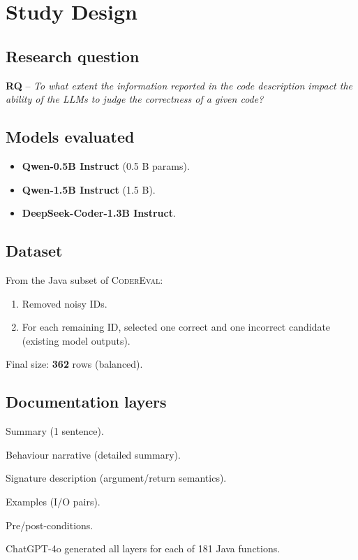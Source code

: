 \documentclass[a4paper]{usiinfbachelorproject}
\begin{document}
\section{Study Design}\label{sec:design}

\subsection*{Research question}
\noindent\textbf{RQ} –  
\emph{To what extent the information reported in the code description impact the ability of the LLMs to judge the correctness of a given code?}

\subsection{Models evaluated}\label{sec:models}
\begin{itemize}[leftmargin=12pt,itemsep=1pt]
  \item \textbf{Qwen-0.5B Instruct} (0.5 B params).  
  \item \textbf{Qwen-1.5B Instruct} (1.5 B).  
  \item \textbf{DeepSeek-Coder-1.3B Instruct}.  
\end{itemize}

\subsection{Dataset}\label{sec:dataset}
From the Java subset of \textsc{CoderEval}:
\begin{enumerate}[label=\alph*),leftmargin=14pt,itemsep=0pt]
  \item Removed noisy IDs.  
  \item For each remaining ID, selected one correct and one incorrect candidate (existing model outputs).  
\end{enumerate}
Final size: \textbf{362} rows (balanced).

\subsection{Documentation layers}\label{sec:layers}
\begin{description}[style=nextline,leftmargin=15pt]
  \item[L1] Summary (1 sentence).  
  \item[L2] Behaviour narrative (detailed summary).  
  \item[L3] Signature description (argument/return semantics).  
  \item[L4] Examples (I/O pairs).  
  \item[L5] Pre/post-conditions.  
\end{description}
ChatGPT-4o generated all layers for each of 181 Java functions.
\end{document}
